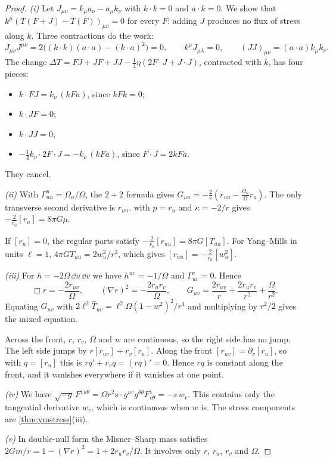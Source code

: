 \begin{proof}
\emph{(i)} Let $J_{\mu\nu}=k_\mu a_\nu-a_\mu k_\nu$ with $k\cdot k=0$ and $a\cdot k=0$. We show that $k^\mu(T(F+J)-T(F))_{\mu\nu}=0$ for every $F$: adding $J$ produces no flux of stress along $k$. Three contractions do the work:
\[
J_{\mu\nu}J^{\mu\nu}=2\bigl((k\cdot k)(a\cdot a)-(k\cdot a)^2\bigr)=0,\qquad k^\mu J_{\mu\lambda}=0,\qquad (JJ)_{\mu\nu}=(a\cdot a)k_\mu k_\nu .
\]
The change $\Delta T=FJ+JF+JJ-\frac14\eta(2F\cdot J+J\cdot J)$, contracted with $k$, has four pieces:
\begin{itemize}[nosep]
\item $k\cdot FJ=k_\nu\,(kFa)$, since $kFk=0$;
\item $k\cdot JF=0$;
\item $k\cdot JJ=0$;
\item $-\frac14k_\nu\cdot2F\cdot J=-k_\nu\,(kFa)$, since $F\cdot J=2kFa$.
\end{itemize}
They cancel.

\emph{(ii)} With $\Gamma^u_{uu}=\Omega_u/\Omega$, the $2+2$ formula gives $G_{uu}=-\frac2r(r_{uu}-\frac{\Omega_u}\Omega r_u)$. The only transverse second derivative is $r_{uu}$.  with $p=r_u$ and $\kappa=-2/r$ gives $-\frac2{r_0}[r_u]=8\pi G\mu$.

If $[r_u]=0$, the regular parts satisfy $-\frac2{r_0}[r_{uu}]=8\pi G[T_{uu}]$. For Yang--Mills in units $\ell=1$, $4\pi GT_{uu}=2w_u^2/r^2$, which gives $[r_{uu}]=-\frac2{r_0}[w_u^2]$.

\emph{(iii)} For $h=-2\Omega\,\dd u\,\dd v$ we have $h^{uv}=-1/\Omega$ and $\Gamma^c_{uv}=0$. Hence
\[
\Box r=-\frac{2r_{uv}}\Omega,\qquad(\nabla r)^2=-\frac{2r_ur_v}\Omega,\qquad G_{uv}=\frac{2r_{uv}}r+\frac{2r_ur_v}{r^2}+\frac\Omega{r^2}.
\]
Equating $G_{uv}$ with $2\ell^2\hat T_{uv}=\ell^2\Omega(1-w^2)^2/r^4$ and multiplying by $r^2/2$ gives the mixed equation.

Across the front, $r$, $r_v$, $\Omega$ and $w$ are continuous, so the right side has no jump. The left side jumps by $r[r_{uv}]+r_v[r_u]$. Along the front $[r_{uv}]=\partial_v[r_u]$, so with $q=[r_u]$ this is $rq'+r_vq=(rq)'=0$. Hence $rq$ is constant along the front, and it vanishes everywhere if it vanishes at one point.

\emph{(iv)} We have $\sqrt{-g}\,F^{1u\theta}=\Omega r^2s\cdot g^{uv}g^{\theta\theta}F^1_{v\theta}=-s\,w_v$. This contains only the tangential derivative $w_v$, which is continuous when $w$ is. The stress components are \cref{thm:ymstress}(iii).

\emph{(v)} In double-null form the Misner--Sharp mass satisfies $2Gm/r=1-(\nabla r)^2=1+2r_ur_v/\Omega$. It involves only $r$, $r_u$, $r_v$ and $\Omega$.
\end{proof}


